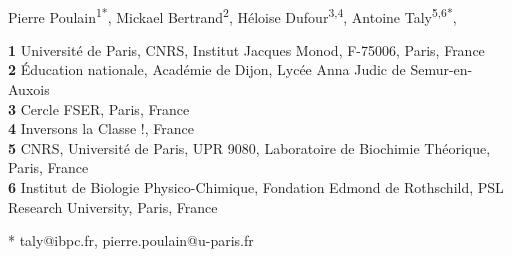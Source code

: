 \documentclass[10pt,letterpaper]{article}
\begin{document}
\vspace*{0.2in}

\begin{flushleft}
{\Large
\textbf{} %
}
\newline
\\
Pierre Poulain\textsuperscript{1*},
Mickael Bertrand\textsuperscript{2},
Héloise Dufour\textsuperscript{3,4},
Antoine Taly\textsuperscript{5,6*},

\bigskip
\textbf{1} Université de Paris, CNRS, Institut Jacques Monod, F-75006, Paris, France
\\
\textbf{2} Éducation nationale, Académie de Dijon, Lycée Anna Judic de Semur-en-Auxois
\\
\textbf{3} Cercle FSER, Paris, France
\\
\textbf{4} Inversons la Classe !, France
\\
\textbf{5} CNRS, Université de Paris, UPR 9080, Laboratoire de Biochimie Théorique, Paris, France
\\
\textbf{6} Institut de Biologie Physico-Chimique, Fondation Edmond de Rothschild, PSL Research University, Paris, France
\\
\bigskip

% 
%





* taly@ibpc.fr, pierre.poulain@u-paris.fr

\end{flushleft}
\end{document}
